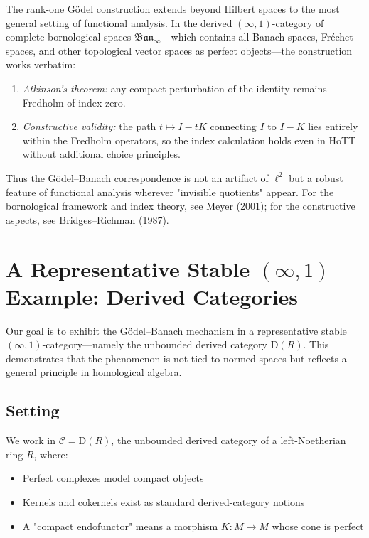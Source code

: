 \documentclass[11pt]{article}
\theoremstyle{definition}
\newcommand{\Ban}{\mathfrak{Ban}_{\!\infty}}
\begin{document}
The rank-one Gödel construction extends beyond Hilbert spaces to the
most general setting of functional analysis.  In the derived
$(\infty,1)$-category of complete bornological spaces $\Ban$—which
contains all Banach spaces, Fréchet spaces, and other topological
vector spaces as perfect objects—the construction works verbatim:

\begin{enumerate}
  \item \emph{Atkinson's theorem:} any compact perturbation of the identity
        remains Fredholm of index zero.
  \item \emph{Constructive validity:} the path $t \mapsto I - tK$
        connecting $I$ to $I - K$ lies entirely within the Fredholm
        operators, so the index calculation holds even in HoTT without
        additional choice principles.
\end{enumerate}

Thus the Gödel–Banach correspondence is not an artifact of $\ell^2$ but a
robust feature of functional analysis wherever "invisible quotients"
appear.  For the bornological framework and index theory, see Meyer (2001);
for the constructive aspects, see Bridges–Richman (1987).

\section{A Representative Stable $(\infty,1)$ Example: Derived Categories}
\label{sec:infty-cats}

Our goal is to exhibit the Gödel–Banach mechanism in a representative stable $(\infty,1)$-category—namely the unbounded derived category $\mathrm D(R)$. This demonstrates that the phenomenon is not tied to normed spaces but reflects a general principle in homological algebra.

\subsection{Setting}

We work in $\mathcal{C} = \mathrm{D}(R)$, the unbounded derived category of a left-Noetherian ring $R$, where:
\begin{itemize}
\item Perfect complexes model compact objects
\item Kernels and cokernels exist as standard derived-category notions
\item A "compact endofunctor" means a morphism $K: M \to M$ whose cone is perfect
\end{itemize}
\end{document}
